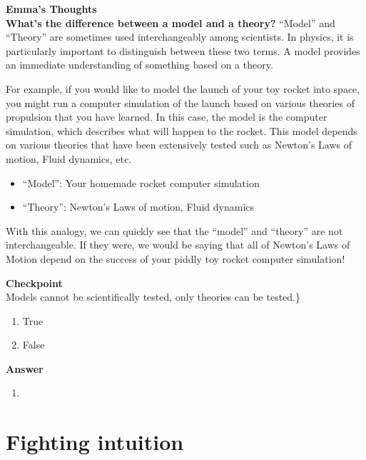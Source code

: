 \documentclass[9pt,Preprint]{lapreprint}
\begin{document}
\begin{framed}
\textbf{Emma's Thoughts}\\
\textbf{What's the difference between a model and a theory?}
``Model'' and ``Theory'' are sometimes used interchangeably among scientists. In physics, it is particularly important to distinguish between these two terms. A model provides an immediate understanding of something based on a theory.

For example, if you would like to model the launch of your toy rocket into space, you might run a computer simulation of the launch based on various theories of propulsion that you have learned. In this case, the model is the computer simulation, which describes what will happen to the rocket. This model depends on various theories that have been extensively tested such as Newton's Laws of motion, Fluid dynamics, etc.

\begin{itemize}
\item ``Model'': Your homemade rocket computer simulation
\item ``Theory'': Newton's Laws of motion, Fluid dynamics
\end{itemize}

With this analogy, we can quickly see that the ``model'' and ``theory'' are not interchangeable. If they were, we would be saying that all of Newton's Laws of Motion depend on the success of your piddly toy rocket computer simulation!
\end{framed}

\begin{framed}
\textbf{Checkpoint}\\
Models cannot be scientifically tested, only theories can be tested.\}

\begin{enumerate}
\item True
\item False
\end{enumerate}

\begin{framed}
\textbf{Answer}\\
\begin{enumerate}[resume]
\item
\end{enumerate}
\end{framed}
\end{framed}

\section{Fighting intuition}
\end{document}

